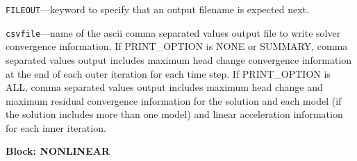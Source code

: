 \begin{description}
\item \texttt{FILEOUT}---keyword to specify that an output filename is expected next.

\item \texttt{csvfile}---name of the ascii comma separated values output file to write solver convergence information. If PRINT\_OPTION is NONE or SUMMARY, comma separated values output includes maximum head change convergence information at the end of each outer iteration for each time step. If PRINT\_OPTION is ALL, comma separated values output includes maximum head change and maximum residual convergence information for the solution and each model (if the solution includes more than one model) and linear acceleration information for each inner iteration.

\end{description}
\item \textbf{Block: NONLINEAR}

